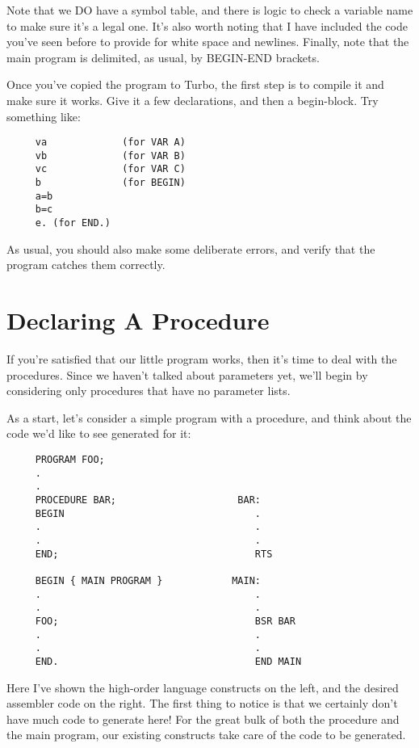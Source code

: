 Note  that we DO have a symbol table, and there is logic to check a variable name to make sure it's a legal one. It's also worth noting that I  have  included  the  code  you've  seen  before to provide for white space  and  newlines. Finally, note that the main program is delimited, as usual, by BEGIN-END brackets.

Once you've copied  the  program  to  Turbo, the first step is to compile it and make sure it  works. Give it a few declarations, and then a begin-block. Try something like:

\begin{verbatim}
     va             (for VAR A)
     vb             (for VAR B)
     vc             (for VAR C)
     b              (for BEGIN)
     a=b
     b=c
     e. (for END.)
\end{verbatim}

As usual, you should also make some deliberate errors, and verify that the program catches them correctly.

\section{Declaring A Procedure}

If you're satisfied that our little program works, then it's time to  deal  with  the  procedures. Since we haven't  talked  about parameters yet, we'll begin by considering  only  procedures that have no parameter lists.

As a start, let's consider a simple program with a procedure, and think about the code we'd like to see generated for it:

\begin{verbatim}
     PROGRAM FOO;
     .
     .
     PROCEDURE BAR;                     BAR:
     BEGIN                                 .
     .                                     .
     .                                     .
     END;                                  RTS

     BEGIN { MAIN PROGRAM }            MAIN:
     .                                     .
     .                                     .
     FOO;                                  BSR BAR
     .                                     .
     .                                     .
     END.                                  END MAIN
\end{verbatim}

Here I've shown  the  high-order language constructs on the left, and the desired assembler code on the right. The first  thing to notice  is that we certainly don't have  much  code  to  generate here!  For  the  great  bulk  of  both the procedure and the main program, our existing constructs take care of  the  code  to  be generated.

